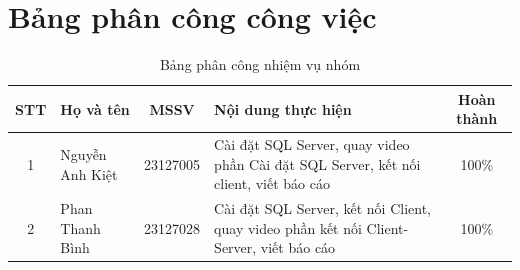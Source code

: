 \section*{Bảng phân công công việc}

\begin{table}[H]
    \centering
    \setlength{\tabcolsep}{10pt} %
    \renewcommand{\arraystretch}{1.5} %
    \begin{tabular}{|c|l|c|p{6cm}|c|}
        \hline
        \textbf{STT} & \textbf{Họ và tên} & \textbf{MSSV} & \textbf{Nội dung thực hiện} & \textbf{Hoàn thành} \\ \hline
        1 & Nguyễn Anh Kiệt & 23127005 & Cài đặt SQL Server, quay video phần Cài đặt SQL Server, kết nối client, viết báo cáo & 100\% \\ \hline
        2 & Phan Thanh Bình & 23127028 & Cài đặt SQL Server, kết nối Client, quay video phần kết nối Client-Server, viết báo cáo & 100\% \\ \hline
        

    \end{tabular}
    \caption{Bảng phân công nhiệm vụ nhóm}
\end{table}